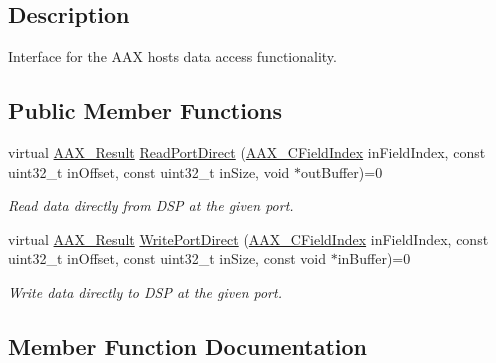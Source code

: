 \subsection{Description}
Interface for the A\+AX host\textquotesingle{}s data access functionality. \subsection*{Public Member Functions}
\begin{DoxyCompactItemize}
\item 
virtual \mbox{\hyperlink{a00392_a4d8f69a697df7f70c3a8e9b8ee130d2f}{A\+A\+X\+\_\+\+Result}} \mbox{\hyperlink{a01741_ac722af5542e8e2dd4a52c6ef621ed034}{Read\+Port\+Direct}} (\mbox{\hyperlink{a00392_ae807f8986143820cfb5d6da32165c9c7}{A\+A\+X\+\_\+\+C\+Field\+Index}} in\+Field\+Index, const uint32\+\_\+t in\+Offset, const uint32\+\_\+t in\+Size, void $\ast$out\+Buffer)=0
\begin{DoxyCompactList}\small\item\em Read data directly from D\+SP at the given port. \end{DoxyCompactList}\item 
virtual \mbox{\hyperlink{a00392_a4d8f69a697df7f70c3a8e9b8ee130d2f}{A\+A\+X\+\_\+\+Result}} \mbox{\hyperlink{a01741_adce9d27f8faacffeed2dc1ec28561bfc}{Write\+Port\+Direct}} (\mbox{\hyperlink{a00392_ae807f8986143820cfb5d6da32165c9c7}{A\+A\+X\+\_\+\+C\+Field\+Index}} in\+Field\+Index, const uint32\+\_\+t in\+Offset, const uint32\+\_\+t in\+Size, const void $\ast$in\+Buffer)=0
\begin{DoxyCompactList}\small\item\em Write data directly to D\+SP at the given port. \end{DoxyCompactList}\end{DoxyCompactItemize}


\subsection{Member Function Documentation}
\mbox{\label{a01741_ac722af5542e8e2dd4a52c6ef621ed034}} 
